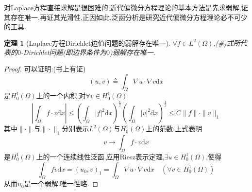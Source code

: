 \documentclass[12pt,a4paper]{article}
\newtheorem{thm}{定理}[subsection]  %
\begin{document}
对Laplace方程直接求解是很困难的,近代偏微分方程理论的基本方法是先求弱解,证其存在唯一,再证其光滑性,正因如此,泛函分析是研究近代偏微分方程理论必不可少的工具.
\begin{thm}[Laplace方程Dirichlet边值问题的弱解存在唯一]
    $\forall f \in L^2(\Omega)$,(\#)式所代表的$0$-Dirichlet问题(即边界条件为$0$)弱解存在唯一.
\end{thm}
\begin{proof}
    可以证明:(书上有证)\[(u,v) \triangleq \int_{\Omega} \nabla u \cdot \nabla v \mathrm{d}x\]
    是$H_0^1(\Omega)$上的一个内积,对$\forall v \in H_0^1(\Omega)$
    \[|\int_{\Omega}f\cdot v \mathrm{d}x|\leq (\int_{\Omega}|f|^2\mathrm{d}x)^{\frac{1}{2}} (\int_{\Omega}|v|^2\mathrm{d}x)^{\frac{1}{2}}
    \leq C \|f\|\cdot \|v\|_1\]
    其中$\|\cdot\|$与$\|\cdot\|_1$分别表示$L^2(\Omega)$与$H_0^1(\Omega)$上的范数.上式表明
    \[v \to \int_{\Omega}f\cdot v \mathrm{d}x\]
    是$H_0^1(\Omega)$上的一个连续线性泛函.应用Riesz表示定理,$\exists u \in H_0^1(\Omega)$,使得
    \[\int_{\Omega}fv\mathrm{d}x = (u_0,v)_1 = \int_{\Omega}\nabla u \cdot \nabla v\mathrm{d}x\quad (\forall v \in H_0^1(\Omega))\]
    从而$u_0$是一个弱解.唯一性略.
\end{proof}
\end{document}
